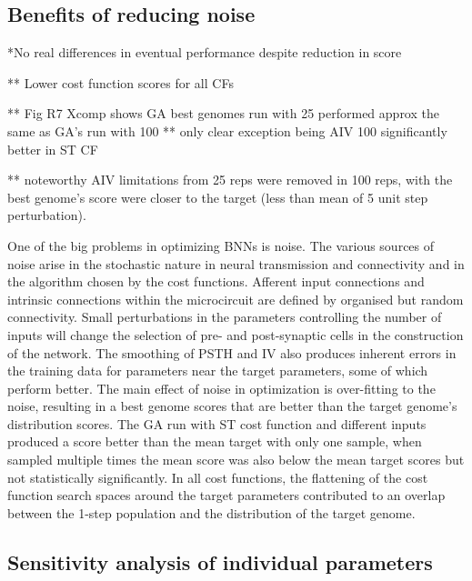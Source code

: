 \subsection{Benefits of reducing noise}\label{sec:GA:benef-reduc-noise}

\smallskip{} 

*No real differences in eventual performance
  despite reduction in score

** Lower cost function scores for all CFs

** Fig R7 Xcomp shows GA best genomes run with 25
    performed approx the same as GA's run with 100
** only clear exception being AIV 100 significantly better in ST CF

** noteworthy AIV limitations from 25 reps were removed
  in 100 reps, with the best genome's score were closer to the target
  (less than mean of 5 unit step perturbation).

\smallskip{}

One of the big problems in optimizing BNNs is noise.  The various sources of
noise arise in the stochastic nature in neural transmission and connectivity
and in the algorithm chosen by the cost functions. Afferent input connections
and intrinsic connections within the microcircuit are defined by organised but
random connectivity.  Small perturbations in the parameters controlling the
number of inputs will change the selection of pre- and post-synaptic cells in
the construction of the network.  The smoothing of PSTH and IV also produces
inherent errors in the training data for parameters near the target
parameters, some of which perform better.  The main effect of noise in
optimization is over-fitting to the noise, resulting in a best genome scores
that are better than the target genome's distribution scores.  The GA run with
ST cost function and different inputs produced a score better than the mean
target with only one sample, when sampled multiple times the mean score was
also below the mean target scores but not statistically significantly.  In all
cost functions, the flattening of the cost function search spaces around the
target parameters contributed to an overlap between the 1-step population and
the distribution of the target genome.

\subsection{Sensitivity analysis of individual parameters}

